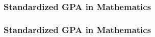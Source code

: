 \documentclass{beamer}
\begin{document}
\begin{frame}
    \label{update_scott}
    \frametitle{Standardized GPA in Mathematics}
        {
    }
\end{frame}

\begin{frame}
    \label{update_scott}
    \frametitle{Standardized GPA in Mathematics}
        {
    }
\end{frame}
\end{document}
